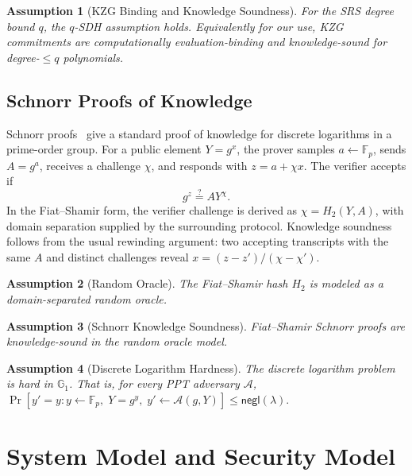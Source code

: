 \documentclass[lettersize,journal]{IEEEtran}
\newtheorem{assumption}{Assumption}
\newcommand{\GG}{\mathbb{G}}
\newcommand{\FF}{\mathbb{F}}
\begin{document}
\begin{assumption}[KZG Binding and Knowledge Soundness]\label{ass:kzg_soundness}
For the SRS degree bound \(q\), the \(q\)-SDH assumption holds. Equivalently for our use, KZG commitments are computationally evaluation-binding and knowledge-sound for degree-\(\le q\) polynomials.
\end{assumption}

\subsection{Schnorr Proofs of Knowledge}
Schnorr proofs~\cite{Schnorr1991Sig} give a standard proof of knowledge for discrete logarithms in a prime-order group. For a public element \(Y=g^x\), the prover samples \(a\leftarrow\FF_p\), sends \(A=g^a\), receives a challenge \(\chi\), and responds with \(z=a+\chi x\). The verifier accepts if
\[
    g^z \stackrel{?}{=} A Y^\chi .
\]
In the Fiat--Shamir form, the verifier challenge is derived as \(\chi=H_2(Y,A)\), with domain separation supplied by the surrounding protocol. Knowledge soundness follows from the usual rewinding argument: two accepting transcripts with the same \(A\) and distinct challenges reveal \(x=(z-z')/(\chi-\chi')\).

\begin{assumption}[Random Oracle]\label{ass:random_oracle}
The Fiat--Shamir hash \(H_2\) is modeled as a domain-separated random oracle.
\end{assumption}

\begin{assumption}[Schnorr Knowledge Soundness]\label{ass:schnorr_knowledge}
Fiat--Shamir Schnorr proofs are knowledge-sound in the random oracle model.
\end{assumption}

\begin{assumption}[Discrete Logarithm Hardness]\label{ass:discrete_log}
The discrete logarithm problem is hard in \(\GG_1\). That is, for every PPT adversary \(\mathcal{A}\), $
    \Pr\!\left[y'=y:
    y\leftarrow\FF_p,\; Y=g^y,\; y'\leftarrow\mathcal{A}(g,Y)
    \right]\le \mathsf{negl}(\lambda).$
\end{assumption}




\section{System Model and Security Model}
\end{document}
